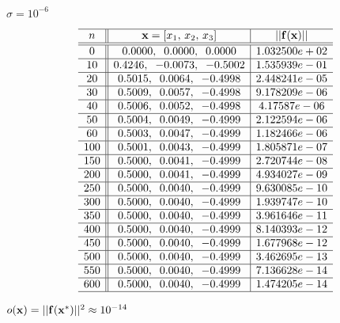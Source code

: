 \documentclass{article}
\def\lthtmlcheckvsize{\ifdim\ht\sizebox<\vsize 
  \ifdim\wd\sizebox<\hsize\expandafter\hfill\fi \expandafter\vfill
  \else\expandafter\vss\fi}%
\begin{document}
{\newpage\clearpage
{}%
$ \sigma=10^{-6}$%
\lthtmlindisplaymathZ
\lthtmlcheckvsize\clearpage}

{\newpage\clearpage
{}%
\begin{displaymath}\begin{array}{c||c|c}\hline
n & {\bf x}=[x_1,\,x_2,\,x_3]  & ||{\bf f}({\bf x})|| \\\hline\hline
0  &	0.0000,\;\; 0.0000,\;\;  0.0000	&1.032500e+02 \\\hline
10 &	0.4246,\;\;-0.0073,\;\;-0.5002	&1.535939e-01 \\\hline
20 &	0.5015,\;\; 0.0064,\;\; -0.4998	&2.448241e-05 \\\hline
30 &	0.5009,\;\; 0.0057,\;\; -0.4998	&9.178209e-06 \\\hline
40 &	0.5006,\;\; 0.0052,\;\; -0.4998	&4.17587e-06 \\\hline
50 &	0.5004,\;\; 0.0049,\;\; -0.4999	&2.122594e-06 \\\hline
60 &	0.5003,\;\; 0.0047,\;\; -0.4999	&1.182466e-06 \\\hline
100&	0.5001,\;\; 0.0043,\;\; -0.4999	&1.805871e-07 \\\hline
150&	0.5000,\;\; 0.0041,\;\; -0.4999	&2.720744e-08 \\\hline
200&	0.5000,\;\; 0.0041,\;\; -0.4999	&4.934027e-09 \\\hline
250&	0.5000,\;\; 0.0040,\;\; -0.4999	&9.630085e-10 \\\hline
300&	0.5000,\;\; 0.0040,\;\; -0.4999	&1.939747e-10 \\\hline
350&	0.5000,\;\; 0.0040,\;\; -0.4999	&3.961646e-11 \\\hline
400&	0.5000,\;\; 0.0040,\;\; -0.4999	&8.140393e-12 \\\hline
450&	0.5000,\;\; 0.0040,\;\; -0.4999	&1.677968e-12 \\\hline
500&	0.5000,\;\; 0.0040,\;\; -0.4999	&3.462695e-13 \\\hline
550&	0.5000,\;\; 0.0040,\;\; -0.4999	&7.136628e-14 \\\hline
600&	0.5000,\;\; 0.0040,\;\; -0.4999	&1.474205e-14 \\\hline
\end{array}\end{displaymath}%
\lthtmldisplayZ
\lthtmlcheckvsize\clearpage}

{\newpage\clearpage
{}%
$ o({\bf x})=||{\bf f}({\bf x}^*)||^2\approx 10^{-14}$%
\lthtmlindisplaymathZ
\lthtmlcheckvsize\clearpage}
\end{document}
